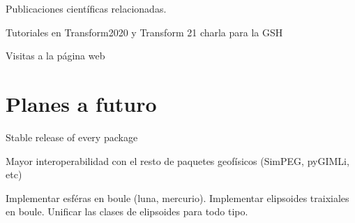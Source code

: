 Publicaciones científicas relacionadas.

Tutoriales en Transform2020 y Transform 21 charla para la GSH

Visitas a la página web


\section{Planes a futuro}

Stable release of every package

Mayor interoperabilidad con el resto de paquetes geofísicos (SimPEG, pyGIMLi, etc)

Implementar esféras en boule (luna, mercurio).
Implementar elipsoides traixiales en boule.
Unificar las clases de elipsoides para todo tipo.
